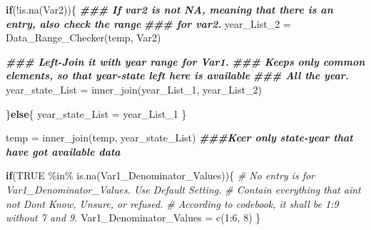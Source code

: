 \documentclass[
]{article}
\newenvironment{Shaded}{\begin{snugshade}}{\end{snugshade}}
\newcommand{\CommentTok}[1]{\textcolor[rgb]{0.56,0.35,0.01}{\textit{#1}}}
\newcommand{\ConstantTok}[1]{\textcolor[rgb]{0.00,0.00,0.00}{#1}}
\newcommand{\ControlFlowTok}[1]{\textcolor[rgb]{0.13,0.29,0.53}{\textbf{#1}}}
\newcommand{\DecValTok}[1]{\textcolor[rgb]{0.00,0.00,0.81}{#1}}
\newcommand{\DocumentationTok}[1]{\textcolor[rgb]{0.56,0.35,0.01}{\textbf{\textit{#1}}}}
\newcommand{\FunctionTok}[1]{\textcolor[rgb]{0.00,0.00,0.00}{#1}}
\newcommand{\NormalTok}[1]{#1}
\newcommand{\OtherTok}[1]{\textcolor[rgb]{0.56,0.35,0.01}{#1}}
\newcommand{\SpecialCharTok}[1]{\textcolor[rgb]{0.00,0.00,0.00}{#1}}
\begin{document}
\begin{Shaded}
\begin{Highlighting}[]
  \ControlFlowTok{if}\NormalTok{(}\SpecialCharTok{!}\FunctionTok{is.na}\NormalTok{(Var2))\{}
    \DocumentationTok{\#\#\# If var2 is not NA, meaning that there is an entry, also check the range}
    \DocumentationTok{\#\#\# for var2.}
\NormalTok{    year\_List\_2 }\OtherTok{=} \FunctionTok{Data\_Range\_Checker}\NormalTok{(temp, Var2)}
    
    \DocumentationTok{\#\#\# Left{-}Join it with year range for Var1. }
    \DocumentationTok{\#\#\# Keeps only common elements, so that year{-}state left here is available}
    \DocumentationTok{\#\#\# All the year.}
\NormalTok{    year\_state\_List }\OtherTok{=} \FunctionTok{inner\_join}\NormalTok{(year\_List\_1, year\_List\_2)}
    
\NormalTok{  \}}\ControlFlowTok{else}\NormalTok{\{}
\NormalTok{    year\_state\_List }\OtherTok{=}\NormalTok{ year\_List\_1}
\NormalTok{  \}}
  
\NormalTok{  temp }\OtherTok{=} \FunctionTok{inner\_join}\NormalTok{(temp, year\_state\_List)}
  \DocumentationTok{\#\#\#Keer only state{-}year that have got available data}
  
  \ControlFlowTok{if}\NormalTok{(}\ConstantTok{TRUE} \SpecialCharTok{\%in\%} \FunctionTok{is.na}\NormalTok{(Var1\_Denominator\_Values))\{}
    \CommentTok{\# No entry is for Var1\_Denominator\_Values. Use Default Setting.}
    \CommentTok{\# Contain everything that ain\textquotesingle{}t not Don\textquotesingle{}t Know, Unsure, or refused.}
    \CommentTok{\# According to codebook, it shall be 1:9 without 7 and 9.}
\NormalTok{    Var1\_Denominator\_Values }\OtherTok{=} \FunctionTok{c}\NormalTok{(}\DecValTok{1}\SpecialCharTok{:}\DecValTok{6}\NormalTok{, }\DecValTok{8}\NormalTok{)}
\NormalTok{  \}}
  

\end{Highlighting}
\end{Shaded}
\end{document}
